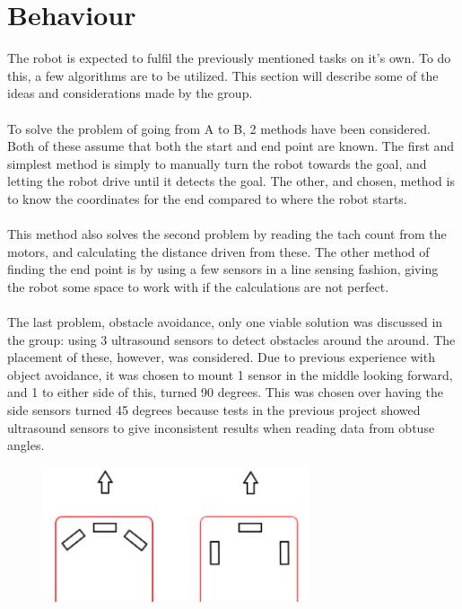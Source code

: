 \section{Behaviour}
The robot is expected to fulfil the previously mentioned tasks on it's own. To do this, a few algorithms are to be utilized. This section will describe some of the ideas and considerations made by the group.\\\\
To solve the problem of going from A to B, 2 methods have been considered. Both of these assume that both the start and end point are known. The first and simplest method is simply to manually turn the robot towards the goal, and letting the robot drive until it detects the goal. The other, and chosen, method is to know the coordinates for the end compared to where the robot starts.\\\\
This method also solves the second problem by reading the tach count from the motors, and calculating the distance driven from these. The other method of finding the end point is by using a few sensors in a line sensing fashion, giving the robot some space to work with if the calculations are not perfect.\\\\
The last problem, obstacle avoidance, only one viable solution was discussed in the group: using 3 ultrasound sensors to detect obstacles around the around. The placement of these, however, was considered. Due to previous experience with object avoidance, it was chosen to mount 1 sensor in the middle looking forward, and 1 to either side of this, turned 90 degrees. This was chosen over having the side sensors turned 45 degrees because tests in the previous project showed ultrasound sensors to give inconsistent results when reading data from obtuse angles.

\begin{figure}[!ht]
	\centering
	\includegraphics[width=0.7\textwidth]{figures/sensorMountingTheory.PNG}
	\caption{}
	\label{Hardware diagram}
\end{figure}